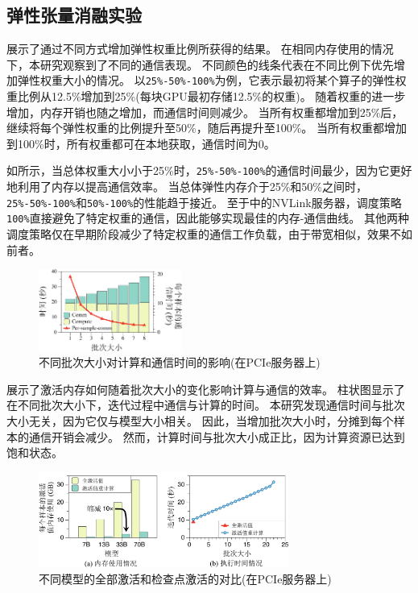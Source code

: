 \subsection{弹性张量消融实验}

展示了通过不同方式增加弹性权重比例所获得的结果。  
在相同内存使用的情况下，本研究观察到了不同的通信表现。  
不同颜色的线条代表在不同比例下优先增加弹性权重大小的情况。  
以\texttt{25\%-50\%-100\%}为例，它表示最初将某个算子的弹性权重比例从12.5\%增加到25\%(每块GPU最初存储12.5\%的权重)。  
随着权重的进一步增加，内存开销也随之增加，而通信时间则减少。  
当所有权重都增加到25\%后，继续将每个弹性权重的比例提升至50\%，随后再提升至100\%。  
当所有权重都增加到100\%时，所有权重都可在本地获取，通信时间为0。

如所示，当总体权重大小小于25\%时，\texttt{25\%-50\%-100\%}的通信时间最少，因为它更好地利用了内存以提高通信效率。  
当总体弹性内存介于25\%和50\%之间时，\texttt{25\%-50\%-100\%}和\texttt{50\%-100\%}的性能趋于接近。  
至于中的NVLink服务器，调度策略\texttt{100\%}直接避免了特定权重的通信，因此能够实现最佳的内存-通信曲线。  
其他两种调度策略仅在早期阶段减少了特定权重的通信工作负载，由于带宽相似，效果不如前者。

\begin{figure}[ht]
\centerline{\includegraphics[width=0.42\textwidth]{figures/mtuner/exp-img/activation-comm-crop.pdf}}
\caption{不同批次大小对计算和通信时间的影响(在PCIe服务器上)}
\label{fig:eval-activation-comm}
\end{figure}

展示了激活内存如何随着批次大小的变化影响计算与通信的效率。  
柱状图显示了在不同批次大小下，迭代过程中通信与计算的时间。  
本研究发现通信时间与批次大小无关，因为它仅与模型大小相关。  
因此，当增加批次大小时，分摊到每个样本的通信开销会减少。  
然而，计算时间与批次大小成正比，因为计算资源已达到饱和状态。

\begin{figure}[ht]
\centerline{\includegraphics[width=0.73\textwidth]{figures/mtuner/exp-img/act-overhead-crop.pdf}}
\caption{不同模型的全部激活和检查点激活的对比(在PCIe服务器上)}
\label{fig:activation-overhead}
\end{figure}

